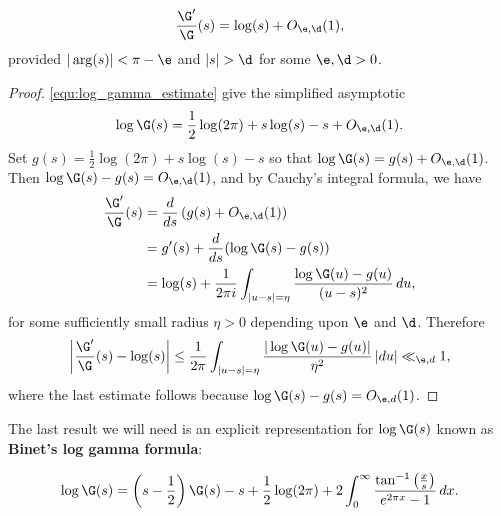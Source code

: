       \begin{proposition}\label{equ:approximtion_for_digamma}
      \[
        \frac{\G'}{\G}(s) = \log(s)+O_{\e,\d}(1),
      \]
      provided $|\arg(s)| < \pi-\e$ and $|s| > \d$ for some $\e,\d > 0$.
      \end{proposition}
      \begin{proof}
        \cref{equ:log_gamma_estimate} give the simplified asymptotic
        \[
          \log\G(s) = \frac{1}{2}\log(2\pi)+s\log(s)-s+O_{\e,\d}(1).
        \]
        Set $g(s) = \frac{1}{2}\log(2\pi)+s\log(s)-s$ so that $\log\G(s) = g(s)+O_{\e,\d}(1)$. Then $\log\G(s)-g(s) = O_{\e,\d}(1)$, and by Cauchy's integral formula, we have
        \begin{align*}
          \frac{\G'}{\G}(s) &= \frac{d}{ds}\left(g(s)+O_{\e,\d}(1)\right) \\
          &= g'(s)+\frac{d}{ds}(\log\G(s)-g(s)) \\
          &= \log(s)+\frac{1}{2\pi i}\int_{|u-s| = \eta}\frac{\log\G(u)-g(u)}{(u-s)^{2}}\,du,
        \end{align*}
        for some sufficiently small radius $\eta > 0$ depending upon $\e$ and $\d$. Therefore
        \[
          \left|\frac{\G'}{\G}(s)-\log(s)\right| \le \frac{1}{2\pi}\int_{|u-s| = \eta}\frac{|\log\G(u)-g(u)|}{\eta^{2}}\,|du| \ll_{\e,d} 1,
        \]
        where the last estimate follows because $\log\G(s)-g(s) = O_{\e,d}(1)$.
      \end{proof}

      The last result we will need is an explicit representation for $\log\G(s)$ known as \textbf{Binet's log gamma formula}:

      \begin{proposition}
        \phantom{ }
        \[
          \log\G(s) = \left(s-\frac{1}{2}\right)\G(s)-s+\frac{1}{2}\log(2\pi)+2\int_{0}^{\infty}\frac{\tan^{-1}\left(\frac{x}{s}\right)}{e^{2\pi x}-1}\,dx.
        \]
      \end{proposition}